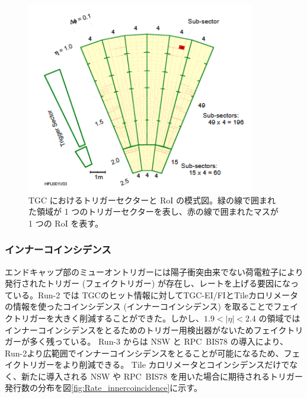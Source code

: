 \begin{figure}[tb]
  \centering
  \includegraphics[clip, width=10cm]{fig/3/RoI.png}
  \caption{TGC におけるトリガーセクターと RoI の模式図。緑の線で囲まれた領域が 1 つのトリガーセクターを表し、赤の線で囲まれたマスが 1 つの RoI を表す。}
  \label{fig:RoI}
\end{figure}

\subsubsection{インナーコインシデンス}
エンドキャップ部のミューオントリガーには陽子衝突由来でない荷電粒子により発行されたトリガー (フェイクトリガー) が存在し、レートを上げる要因になっている。Run-2 では TGCのヒット情報に対してTGC-EI/FIとTileカロリメータの情報を使ったコインシデンス (インナーコインシデンス) を取ることでフェイクトリガーを大きく削減することができた。しかし、$1.9 < |\eta| < 2.4$ の領域ではインナーコインシデンスをとるためのトリガー用検出器がないためフェイクトリガーが多く残っている。
Run-3 からは NSW と RPC~BIS78 の導入により、Run-2より広範囲でインナーコインシデンスをとることが可能になるため、フェイクトリガーをより削減できる。
Tile カロリメータとコインシデンスだけでなく、新たに導入される NSW や RPC~BIS78 を用いた場合に期待されるトリガー発行数の分布を図\ref{fig:Rate_innercoincidence}に示す。

